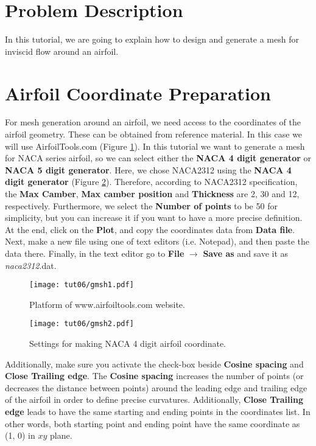 \section{Problem Description}
In this tutorial, we are going to explain how to design and generate a mesh for inviscid flow around an airfoil.
\section{Airfoil Coordinate Preparation}
For mesh generation around an airfoil, we need access to the coordinates of the airfoil geometry. These can be obtained from reference material. In this case we will use AirfoilTools.com (Figure \ref{fig6:gmsh1}). In this tutorial we want to generate a mesh for NACA series airfoil, so we can select either the \textbf{NACA 4 digit generator} or \textbf{NACA 5 digit generator}. Here, we chose NACA2312 using the \textbf{NACA 4 digit generator} (Figure \ref{fig6:gmsh2}). Therefore, according to NACA2312 specification, the \textbf{Max Camber}, \textbf{Max camber position} and \textbf{Thickness} are 2, 30 and 12, respectively. Furthermore, we select the \textbf{Number of points} to be 50 for simplicity, but you can increase it if you want to have a more precise definition. At the end, click on the \textbf{Plot}, and copy the coordinates data from \textbf{Data file}. Next, make a new file using one of text editors (i.e. Notepad), and then paste the data there. Finally, in the text editor go to \textbf{File} $\rightarrow$ \textbf{Save as} and save it as \textit{naca2312}.dat.

\begin{figure}[htbp]
    \centering
    \texttt{[image: tut06/gmsh1.pdf]}
    \caption{Platform of www.airfoiltools.com website.}
    \label{fig6:gmsh1}
\end{figure}
\begin{figure}[htbp]
    \centering
    \texttt{[image: tut06/gmsh2.pdf]}
    \caption{Settings for making NACA 4 digit airfoil coordinate.}
    \label{fig6:gmsh2}
\end{figure}
Additionally, make sure you activate the check-box beside \textbf{Cosine spacing} and \textbf{Close Trailing edge}. The \textbf{Cosine spacing} increases the number of points (or decreases the distance between points) around the leading edge and trailing edge of the airfoil in order to define precise curvatures. Additionally, \textbf{Close Trailing edge} leads to have the same starting and ending points in the coordinates list. In other words, both starting point and ending point have the same coordinate as (1, 0) in $xy$ plane. 
